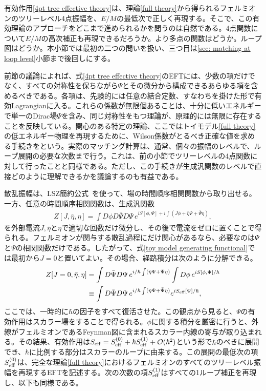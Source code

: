 有効作用\eqref{4pt tree effective theory}は、理論\eqref{full theory}から得られるフェルミオンのツリーレベル4点振幅を、$E/M$の最低次で正しく再現する。そこで、この有効理論のアプローチをどこまで進められるかを問うのは自然である。4点関数について$E/M$の高次補正も再現できるだろうか。より多点の関数はどうか。ループ図はどうか。本小節では最初の二つの問いを扱い、三つ目は\ref{sec: matching at loop level}小節まで後回しにする。

前節の議論によれば、式\eqref{4pt tree effective theory}のEFTには、少数の項だけでなく、すべての対称性を保ちながら$\Psi$とその微分から構成できるあらゆる項を含めるべきである。各項は、先験的には任意の結合定数、すなわちを掛けた形で有効Lagrangianに入る。これらの係数が無限個あることは、十分に低いエネルギーで単一のDirac場$\Psi$を含み、同じ対称性をもつ理論が、原理的には無限に存在することを反映している。関心のある特定の理論、ここではトイモデル\eqref{full theory}の低エネルギー物理を再現するために、Wilson係数がとるべき正確な値を求める手続きをという。実際のマッチング計算は、通常、個々の振幅のレベルで、ループ展開の必要な次数まで行う。これは、前の小節でツリーレベルの4点関数に対して行ったことと同様である。ただし、この手続きが生成汎関数のレベルで直接どのように理解できるかを議論するのも有益である。

散乱振幅は、LSZ簡約公式~\cite{Srednicki:2007ab}を使って、場の時間順序相関関数から取り出せる。一方、任意の時間順序相関関数は、生成汎関数
%
\begin{align} \label{toy model generating functional}
	Z [ J, \bar \eta, \eta] = \int D \phi D \bar \Psi D \Psi \, e^{i S [ \phi, \Psi] + i \int (J \phi + \bar \eta \Psi + \bar \Psi \eta)} ,
\end{align}
%
を外部電流$J, \bar \eta$と$\eta$で適切な回数だけ微分し、その後で電流をゼロに置くことで得られる。フェルミオンが関与する散乱過程にだけ関心があるなら、必要なのは$\Psi$と$\bar \Psi$の相関関数だけである。したがって、式\eqref{toy model generating functional}では最初から$J=0$と置いてよい。その場合、経路積分は次のように分解できる。
%
\begin{align}
	Z [ J=0, \bar \eta, \eta] &= \int  D \bar \Psi D \Psi \, e^{i /\hbar\int (\bar \eta \Psi + \bar \Psi \eta)} \int D \phi \, e^{i S [ \phi, \Psi]/\hbar} \nonumber \\ 
	&\equiv \int  D \bar \Psi D \Psi \, e^{i /\hbar\int (\bar \eta \Psi + \bar \Psi \eta)} e^{i S_{\rm eff} [\Psi]/\hbar} , \label{path integral effective action}
\end{align}
%
ここでは、一時的に$\hbar$の因子をすべて復活させた。この観点から見ると、$\Psi$の有効作用はスカラー場をすることで得られる。$\phi$に関する積分を厳密に行うと、外線がフェルミオンであるFeynman図に含まれるスカラー内線の寄与が取り込まれる。その結果、有効作用は$S_{\rm eff} = S_{\rm eff}^{(0)} + \hbar S_{\rm eff}^{(1)} + \mathcal{O} (\hbar^2)$という形で$\hbar$のべきに展開でき、$\hbar$に比例する部分はスカラーのループに由来する。この展開の最低次の項$S_{\rm eff}^{(0)}$は、完全な理論\eqref{full theory}におけるフェルミオンのすべてのツリーレベル振幅を再現するEFTを記述する。次の次数の項$S_{\rm eff}^{(1)}$はすべての1ループ補正を再現し、以下も同様である。

